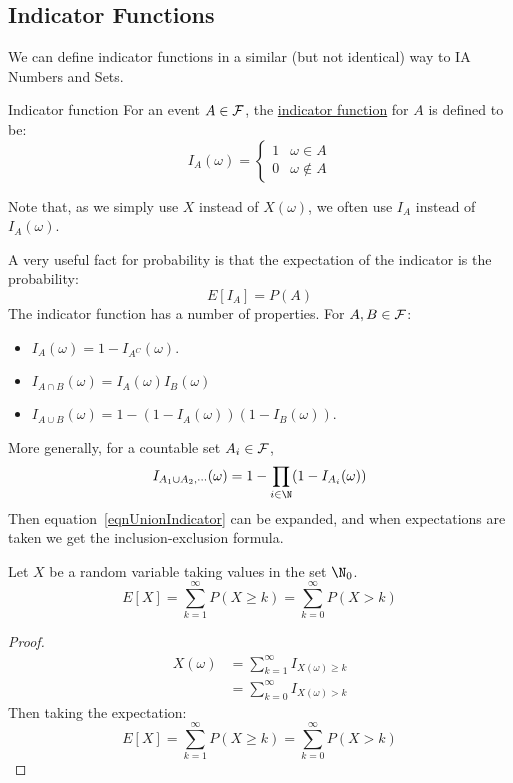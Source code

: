 \documentclass[../Main.tex]{subfiles}
\begin{document}
\subsection{Indicator Functions}
We can define indicator functions in a similar (but not identical) way to IA Numbers and Sets.
\begin{definition}{Indicator function}
    For an event $A \in \mathcal{F}$, the \underline{indicator function} for $A$ is defined to be:
    \begin{equation*}
        I_A(\omega) =
        \begin{cases}
            1 & \omega \in A \\
            0 & \omega \notin A
        \end{cases}
    \end{equation*}
\end{definition}
Note that, as we simply use $X$ instead of $X(\omega)$, we often use $I_A$ instead of $I_A(\omega)$.\par
A very useful fact for probability is that the expectation of the indicator is the probability:
\begin{equation}
    E\left[I_A\right] = P(A)
    \label{eqnIndicatorExpec}
\end{equation}
The indicator function has a number of properties. For $A, B \in \mathcal{F}$:
\begin{itemize}
    \item $I_A(\omega) = 1 - I_{A^C}(\omega)$.
    \item $I_{A \cap B}(\omega) = I_A(\omega) I_B(\omega)$
    \item $I_{A \cup B}(\omega) = 1 - (1 - I_A(\omega))(1 - I_B(\omega))$.
\end{itemize}
More generally, for a countable set $A_i \in \mathcal{F}$,
\begin{equation}
    I_{A_1 \cup A_2, \cdots}(\omega) = 1 - \prod_{i \in \N} (1 - I_{A_i}(\omega))
    \label{eqnUnionIndicator}
\end{equation}
Then equation~\ref{eqnUnionIndicator} can be expanded, and when expectations are taken we get the inclusion-exclusion formula.
\begin{proposition}
    Let $X$ be a random variable taking values in the set $\N_0$.
    \begin{equation*}
        E[X] = \sum_{k=1}^\infty P(X \geq k) = \sum_{k = 0}^\infty P(X > k)
    \end{equation*}
\end{proposition}
\begin{proof}
    \begin{align*}
        X(\omega) &= \sum_{k=1}^\infty I_{X(\omega) \geq k} \\
        &= \sum_{k=0}^\infty I_{X(\omega) > k}
    \end{align*}
    Then taking the expectation:
    \begin{equation*}
        E[X] = \sum_{k=1}^\infty P(X \geq k) = \sum_{k=0}^\infty P(X > k)
    \end{equation*}
\end{proof}
\end{document}
